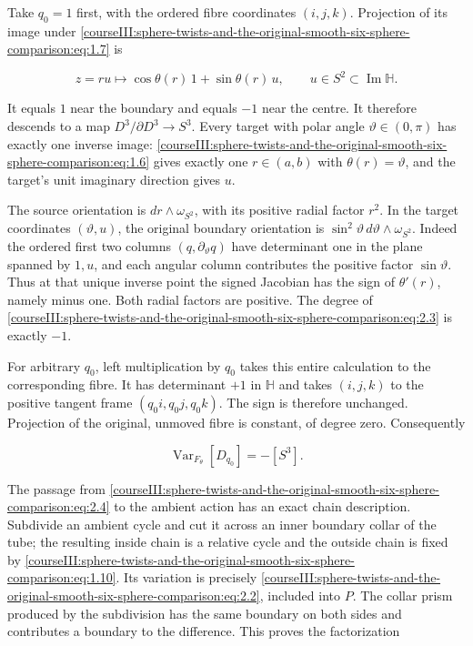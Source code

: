 Take \(q_0=1\) first, with the ordered fibre coordinates \((i,j,k)\). Projection of its image under \eqref{courseIII:sphere-twists-and-the-original-smooth-six-sphere-comparison:eq:1.7} is

\begin{equation}
z=ru\longmapsto
              \cos\theta(r)\,1+\sin\theta(r)\,u,
       \qquad u\in S^2\subset\operatorname{Im}\mathbb H.
 \label{courseIII:sphere-twists-and-the-original-smooth-six-sphere-comparison:eq:2.3}
\end{equation}

It equals \(1\) near the boundary and equals \(-1\) near the centre. It therefore descends to a map \(D^3/\partial D^3\to S^3\). Every target with polar angle \(\vartheta\in(0,\pi)\) has exactly one inverse image: \eqref{courseIII:sphere-twists-and-the-original-smooth-six-sphere-comparison:eq:1.6} gives exactly one \(r\in(a,b)\) with \(\theta(r)=\vartheta\), and the target's unit imaginary direction gives \(u\).

The source orientation is \(dr\wedge\omega_{S^2}\), with its positive radial factor \(r^2\). In the target coordinates \((\vartheta,u)\), the original boundary orientation is \(\sin^2\vartheta\,d\vartheta\wedge\omega_{S^2}\). Indeed the ordered first two columns \((q,\partial_\vartheta q)\) have determinant one in the plane spanned by \(1,u\), and each angular column contributes the positive factor \(\sin\vartheta\). Thus at that unique inverse point the signed Jacobian has the sign of \(\theta'(r)\), namely minus one. Both radial factors are positive. The degree of \eqref{courseIII:sphere-twists-and-the-original-smooth-six-sphere-comparison:eq:2.3} is exactly \(-1\).

For arbitrary \(q_0\), left multiplication by \(q_0\) takes this entire calculation to the corresponding fibre. It has determinant \(+1\) in \(\mathbb H\) and takes \((i,j,k)\) to the positive tangent frame \((q_0i,q_0j,q_0k)\). The sign is therefore unchanged. Projection of the original, unmoved fibre is constant, of degree zero. Consequently

\begin{equation}
\operatorname{Var}_{F_\theta}[D_{q_0}]
                                      =-[S^3].
 \label{courseIII:sphere-twists-and-the-original-smooth-six-sphere-comparison:eq:2.4}
\end{equation}

The passage from \eqref{courseIII:sphere-twists-and-the-original-smooth-six-sphere-comparison:eq:2.4} to the ambient action has an exact chain description. Subdivide an ambient cycle and cut it across an inner boundary collar of the tube; the resulting inside chain is a relative cycle and the outside chain is fixed by \eqref{courseIII:sphere-twists-and-the-original-smooth-six-sphere-comparison:eq:1.10}. Its variation is precisely \eqref{courseIII:sphere-twists-and-the-original-smooth-six-sphere-comparison:eq:2.2}, included into \(P\). The collar prism produced by the subdivision has the same boundary on both sides and contributes a boundary to the difference. This proves the factorization

